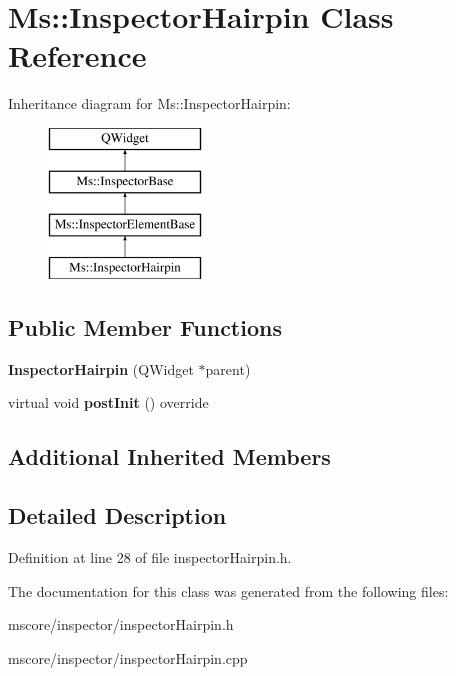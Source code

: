 \hypertarget{class_ms_1_1_inspector_hairpin}{}\section{Ms\+:\+:Inspector\+Hairpin Class Reference}
\label{class_ms_1_1_inspector_hairpin}
Inheritance diagram for Ms\+:\+:Inspector\+Hairpin\+:\begin{figure}[H]
\begin{center}
\leavevmode
\includegraphics[height=4.000000cm]{class_ms_1_1_inspector_hairpin}
\end{center}
\end{figure}
\subsection*{Public Member Functions}
\begin{DoxyCompactItemize}
\item 
\mbox{\label{class_ms_1_1_inspector_hairpin_ae24fc02d4a95cee67ce871905f08ddd6}} 
{\bfseries Inspector\+Hairpin} (Q\+Widget $\ast$parent)
\item 
\mbox{\label{class_ms_1_1_inspector_hairpin_a08b88bb7d295b21f2bcfdf7e7c4705ca}} 
virtual void {\bfseries post\+Init} () override
\end{DoxyCompactItemize}
\subsection*{Additional Inherited Members}


\subsection{Detailed Description}


Definition at line 28 of file inspector\+Hairpin.\+h.



The documentation for this class was generated from the following files\+:\begin{DoxyCompactItemize}
\item 
mscore/inspector/inspector\+Hairpin.\+h\item 
mscore/inspector/inspector\+Hairpin.\+cpp\end{DoxyCompactItemize}
